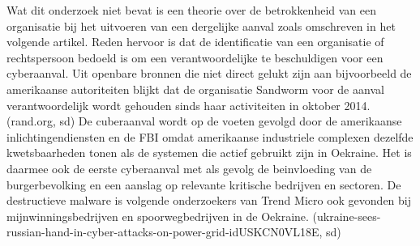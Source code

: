 		Wat dit onderzoek niet bevat is een theorie over de betrokkenheid van een organisatie bij het
		uitvoeren van een dergelijke aanval zoals omschreven in het volgende artikel. Reden hervoor is dat
		de identificatie van een organisatie of rechtspersoon bedoeld is om een verantwoordelijke te
		beschuldigen voor een cyberaanval. Uit openbare bronnen die niet direct gelukt zijn aan bijvoorbeeld
		de amerikaanse autoriteiten blijkt dat de organisatie Sandworm voor de aanval verantwoordelijk
		wordt gehouden sinds haar activiteiten in oktober 2014.
		(rand.org, sd)
		De cuberaanval wordt op de voeten gevolgd door de amerikaanse inlichtingendiensten en de FBI
		omdat amerikaanse industriele complexen dezelfde kwetsbaarheden tonen als de systemen die
		actief gebruikt zijn in Oekraine. Het is daarmee ook de eerste cyberaanval met als gevolg de
		beinvloeding van de burgerbevolking en een aanslag op relevante kritische bedrijven en sectoren. De
		destructieve malware is volgende onderzoekers van Trend Micro ook gevonden bij
		mijnwinningsbedrijven en spoorwegbedrijven in de Oekraine.
		(ukraine-sees-russian-hand-in-cyber-attacks-on-power-grid-idUSKCN0VL18E, sd)
		
